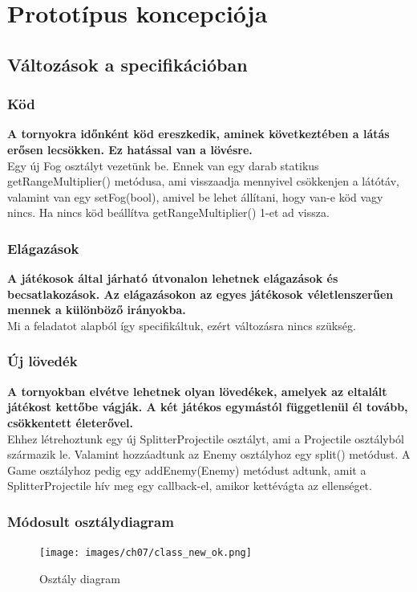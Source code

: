 %
\chapter{Prototípus koncepciója}

\thispagestyle{fancy}
\setcounter{section}{-1}
\section{Változások a specifikációban}

\subsection{Köd}
\textbf{A tornyokra időnként köd ereszkedik, aminek következtében a látás erősen lecsökken. Ez hatással van a lövésre.}\\
Egy új Fog osztályt vezetünk be. Ennek van egy darab statikus getRangeMultiplier() metódusa, ami visszaadja mennyivel csökkenjen a látótáv, valamint van egy setFog(bool), amivel be lehet állítani, hogy van-e köd vagy nincs. Ha nincs köd beállítva getRangeMultiplier() 1-et ad vissza.

\subsection{Elágazások}
\textbf{A játékosok által járható útvonalon lehetnek elágazások és becsatlakozások. Az elágazásokon az egyes játékosok véletlenszerűen mennek a különböző irányokba.}\\
Mi a feladatot alapból így specifikáltuk, ezért változásra nincs szükség.
\subsection{Új lövedék}
\textbf{A tornyokban elvétve lehetnek olyan lövedékek, amelyek az eltalált játékost kettőbe vágják. A két játékos egymástól függetlenül él tovább, csökkentett életerővel.}\\
Ehhez létrehoztunk egy új SplitterProjectile osztályt, ami a Projectile osztályból származik le. Valamint hozzáadtunk az Enemy osztályhoz egy split() metódust. A Game osztályhoz pedig egy addEnemy(Enemy) metódust adtunk, amit a SplitterProjectile hív meg egy callback-el, amikor kettévágta az ellenséget.

\subsection{Módosult osztálydiagram}
\begin{figure}[H]
\begin{center}
\texttt{[image: images/ch07/class\_new\_ok.png]}
\caption{Osztály diagram}
\label{fig:classDiagNew}
\end{center}
\end{figure}

